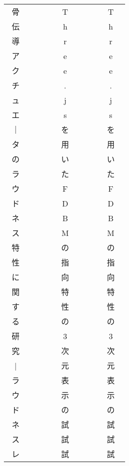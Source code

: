 ﻿
\topmargin -30mm
\textheight 280mm
\renewcommand{\baselinestretch}{0.55}
\pagestyle{empty}

\Large\bf 
   \begin{center}
      \begin{tabular}{|c|c|c|c|c|} 
 ~骨 ~& ~~~~& ~T ~& ~~~& ~T  ~\\
 ~伝 ~& ~~~~& ~h ~& ~~~& ~h  ~\\
 ~導 ~& ~~~~& ~r ~& ~~~& ~r  ~\\
 ~ア ~& ~~~~& ~e ~& ~~~& ~e  ~\\
 ~ク ~& ~~~~& ~e ~& ~~~& ~e  ~\\
 ~チ ~& ~~~~& ~. ~& ~~~& ~.  ~\\
 ~ュ ~& ~~~~& ~j ~& ~~~& ~j  ~\\
 ~エ ~& ~~~~& ~s ~& ~~~& ~s  ~\\
~｜ ~& ~~~~& ~を ~& ~~~& ~を  ~\\
 ~タ ~& ~~~~& ~用 ~& ~~~& ~用  ~\\
 ~の ~& ~~~~& ~い ~& ~~~& ~い  ~\\
 ~ラ ~& ~~~~& ~た ~& ~~~& ~た  ~\\
 ~ウ ~& ~~~~& ~F ~& ~~~& ~F  ~\\
 ~ド ~& ~~~~& ~D ~& ~~~& ~D  ~\\
 ~ネ ~& ~~~~& ~B ~& ~~~& ~B  ~\\
 ~ス ~& ~~~~& ~M ~& ~~~& ~M  ~\\
 ~特 ~& ~~~~& ~の ~& ~~~& ~の  ~\\
 ~性 ~& ~~~~& ~指 ~& ~~~& ~指  ~\\
 ~に ~& ~~~~& ~向 ~& ~~~& ~向  ~\\
 ~関 ~& ~~~~& ~特 ~& ~~~& ~特  ~\\
 ~す ~& ~~~~& ~性 ~& ~~~& ~性  ~\\
 ~る ~& ~~~~& ~の ~& ~~~& ~の  ~\\
 ~研 ~& ~~~~& ~3 ~& ~~~& ~3  ~\\
 ~究 ~& ~~~~& ~次 ~& ~~~& ~次  ~\\
~$|$ ~& ~~~~& ~元 ~& ~~~& ~元  ~\\
 ~ラ ~& ~~~~& ~表 ~& ~~~& ~表  ~\\
 ~ウ ~& ~~~~& ~示 ~& ~~~& ~示  ~\\
 ~ド ~& ~~~~& ~の ~& ~~~& ~の  ~\\
 ~ネ ~& ~~~~& ~試 ~& ~~~& ~試  ~\\
 ~ス ~& ~~~~& ~試 ~& ~~~& ~試  ~\\
 ~レ ~& ~~~~& ~試 ~& ~~~& ~試  ~\\

\end{tabular}
\end{center}
